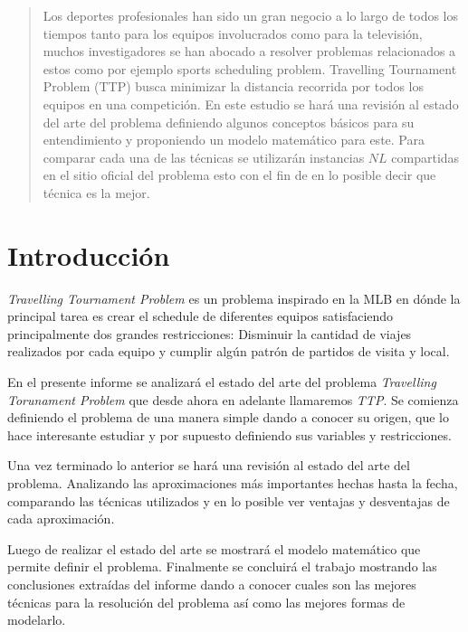 \documentclass[letter, 10pt]{article}
\begin{document}
\begin{abstract}
    Los deportes profesionales han sido un gran negocio a lo largo de todos los tiempos tanto para los equipos involucrados como para la televisión, muchos investigadores se han abocado a resolver problemas relacionados a estos como por ejemplo sports scheduling problem. Travelling Tournament Problem (TTP) busca minimizar la distancia recorrida por todos los equipos en una competición. En este estudio se hará una revisión al estado del arte del problema definiendo algunos conceptos básicos para su entendimiento y proponiendo un modelo matemático para este. Para comparar cada una de las técnicas se utilizarán instancias $NL$ compartidas en el sitio oficial del problema esto con el fin de en lo posible decir que técnica es la mejor.
\end{abstract}

\section{Introducción}
\emph{Travelling Tournament Problem} es un problema inspirado en la MLB en dónde la principal tarea es crear el schedule de diferentes equipos satisfaciendo principalmente dos grandes restricciones: Disminuir la cantidad de viajes realizados por cada equipo y cumplir algún patrón de partidos de visita y local.

En el presente informe se analizará el estado del arte del problema \emph{Travelling Torunament Problem} que desde ahora en adelante llamaremos \emph{TTP}. Se comienza definiendo el problema de una manera simple dando a conocer su origen, que lo hace interesante estudiar y por supuesto definiendo sus variables y restricciones. 

Una vez terminado lo anterior se hará una revisión al estado del arte del problema. Analizando las aproximaciones más importantes hechas hasta la fecha, comparando las técnicas utilizados y en lo posible ver ventajas y desventajas de cada aproximación. 

Luego de realizar el estado del arte se mostrará el modelo matemático que permite definir el problema. Finalmente se concluirá el trabajo mostrando las conclusiones extraídas del informe dando a conocer cuales son las mejores técnicas para la resolución del problema así como las mejores formas de modelarlo. %
\end{document}
